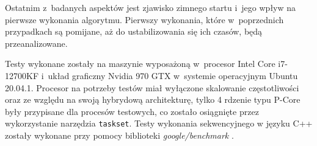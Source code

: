Ostatnim z~badanych aspektów jest zjawisko zimnego startu i~jego wpływ na pierwsze wykonania algorytmu. Pierwszy wykonania, które w~poprzednich przypadkach są pomijane, aż do ustabilizowania się ich czasów, będą przeanalizowane. 

Testy wykonane zostały na maszynie wyposażoną w~procesor Intel\textsuperscript{\tiny\textregistered} Core\textsuperscript{\tiny\texttrademark} i7-12700KF i~układ graficzny Nvidia 970 GTX w~systemie operacyjnym Ubuntu 20.04.1. Procesor na potrzeby testów miał wyłączone skalowanie częstotliwości oraz ze względu na swoją hybrydową architekturę, tylko 4 rdzenie typu P-Core były przypisane dla procesów testowych, co zostało osiągnięte przez wykorzystanie narzędzia \lstinline{taskset}. Testy wykonania sekwencyjnego w języku C++ zostały wykonane przy pomocy biblioteki \textit{google/benchmark} \cite{google-benchmark}.
